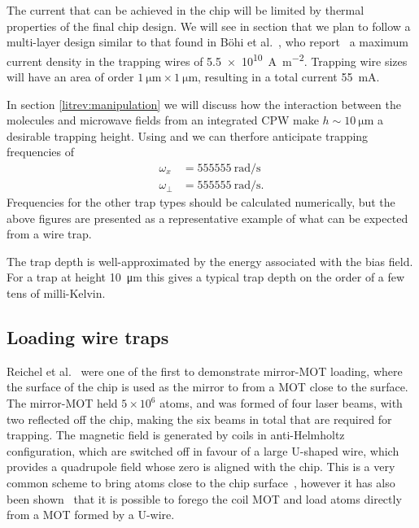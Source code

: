 The current that can be achieved in the chip will be limited by thermal
properties of the final chip design.  We will see in section  that
we plan to follow a multi-layer design similar to that found in B\"ohi et
al.~\cite{Boehi2009}, who report~\cite{rohtula} a maximum current density in the
trapping wires of \SI{5.5e10}{\ampere\per\metre\squared}. Trapping wire sizes
will have an area of order $\SI{1}{\micro\metre} \times \SI{1}{\micro\metre}$,
resulting in a total current \SI{55}{\milli\ampere}.

In section \ref{litrev:manipulation} we will discuss how the interaction between
the molecules and microwave fields from an integrated CPW  make $h \sim \SI{10}{\micro\metre}$ a desirable trapping
height. Using  and 
we can therfore anticipate trapping frequencies of
%
\begin{align}
  \omega_x &= \SI{555555}{\radian \per \second} \\
  \omega_\perp &= \SI{555555}{\radian \per \second}.
\end{align}
%
Frequencies for the other trap types should be calculated numerically, but the above figures are presented as a
representative example of what can be expected from a wire trap.


The trap depth is well-approximated by the energy associated with the bias
field. For a trap at height \SI{10}{\micro\metre} this gives a typical trap
depth on the order of a few tens of milli-Kelvin.~\cite{2011Ac}

\subsection{Loading wire traps}

Reichel et al.~\cite{Reichel1999} were one of the first to demonstrate
mirror-MOT loading, where the surface of the chip is used as the mirror to from
a MOT close to the surface. The mirror-MOT held $5\times10^6$  atoms,
and was formed of four laser beams, with two reflected off the chip, making the
six beams in total that are required for trapping. The magnetic field is
generated by coils in anti-Helmholtz configuration, which are switched off in
favour of a large U-shaped wire, which provides a quadrupole field whose zero is
aligned with the chip. This is a very common scheme to bring atoms close to the
chip surface~\cite{Folman2000, PhysRevLett.97.200405, 2011Ac, Boehi2009},
however it has also been shown~\cite{0256-307X-25-9-034} that it is possible to
forego the coil MOT and load atoms directly from a MOT formed by a U-wire.

